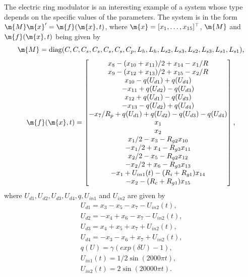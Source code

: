 The electric ring modulator is an interesting example of a system whose type depends on the specific values of the parameters. The system is in the form $\m{M}\m{x}^\prime = \m{f}(\m{x},t)$, where $\m{x} = [x_1, \dots, x_{15}]^\top$, $\m{M}$ and $\m{f}(\m{x},t)$ being given by
%
\begin{equation}
  \m{M} = \mathrm{diag}(C, C, C_s, C_s, C_s, C_s, C_p, L_h, L_h, L_{s2}, L_{s3}, L_{s2}, L_{s3}, L_{s1}, L_{s1}) \text{,}
\end{equation}
%
\begin{equation}
  \m{f}(\m{x},t) = \begin{bmatrix}
    x_8 - (x_{10} + x_{11})/2 + x_{14} - x_1/R \\
    x_9 - (x_{12} + x_{13})/2 + x_{15} - x_2/R \\
    x_{10} - q(U_{d1}) + q(U_{d4}) \\
    -x_{11} + q(U_{d2}) - q(U_{d3}) \\
    x_{12} + q(U_{d1}) - q(U_{d3}) \\
    -x_{13} - q(U_{d2}) + q(U_{d4}) \\
    -x_7/R_p + q(U_{d1}) + q(U_{d2}) - q(U_{d3}) - q(U_{d4}) \\
    x_1 \\
    x_2 \\
    x_1/2 - x_3 - R_{g2}x_{10} \\
    -x_1/2 + x_4 - R_{g3}x_{11} \\
    x_2/2 - x_5 - R_{g2}x_{12} \\
    -x_2/2 + x_6 - R_{g3}x_{13} \\
    -x_1 + U_{in1}(t) - (R_i + R_{g1})x_{14} \\
    -x_2 - (R_c+R_{g1})x_{15}
  \end{bmatrix} \text{,}
\end{equation}
%
where $U_{d1}, U_{d2}, U_{d3}, U_{d4}, q, U_{in1}$ and $U_{in2}$ are given by
%
\begin{equation}
  \begin{array}{l}
    U_{d1} = x_3 - x_5 - x_7 - U_{in2}(t) \text{,} \\
    U_{d2} = -x_4 + x_6 - x_7 - U_{in2}(t) \text{,} \\
    U_{d3} = x_4 + x_5 + x_7 + U_{in2}(t) \text{,} \\
    U_{d4} = -x_3 - x_6 + x_7 + U_{in2}(t) \text{,} \\
    q(U) = \gamma(exp(\delta U) - 1) \text{,} \\
    U_{in1}(t) = 1/2 \sin(2000 \pi t) \text{,} \\
    U_{in2}(t) = 2 \sin(20000 \pi t) \text{.}
  \end{array}
\end{equation}

